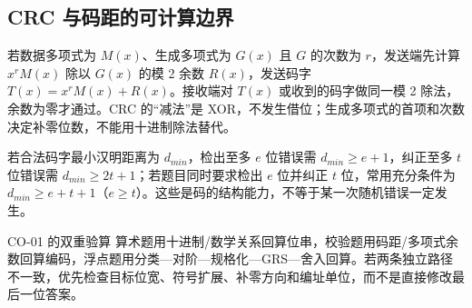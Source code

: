 \documentclass[UTF8,fontset=fandol,11pt,a4paper]{ctexart}
\begin{document}
\subsection{CRC 与码距的可计算边界}
若数据多项式为 $M(x)$、生成多项式为 $G(x)$ 且 $G$ 的次数为 $r$，发送端先计算 $x^rM(x)$ 除以 $G(x)$ 的模 2 余数 $R(x)$，发送码字 $T(x)=x^rM(x)+R(x)$。接收端对 $T(x)$ 或收到的码字做同一模 2 除法，余数为零才通过。CRC 的“减法”是 XOR，不发生借位；生成多项式的首项和次数决定补零位数，不能用十进制除法替代。

若合法码字最小汉明距离为 $d_{min}$，检出至多 $e$ 位错误需 $d_{min}\ge e+1$，纠正至多 $t$ 位错误需 $d_{min}\ge2t+1$；若题目同时要求检出 $e$ 位并纠正 $t$ 位，常用充分条件为 $d_{min}\ge e+t+1$（$e\ge t$）。这些是码的结构能力，不等于某一次随机错误一定发生。

\begin{methodbox}{CO-01 的双重验算}
算术题用十进制/数学关系回算位串，校验题用码距/多项式余数回算编码，浮点题用分类—对阶—规格化—GRS—舍入回算。若两条独立路径不一致，优先检查目标位宽、符号扩展、补零方向和编址单位，而不是直接修改最后一位答案。
\end{methodbox}
\end{document}
